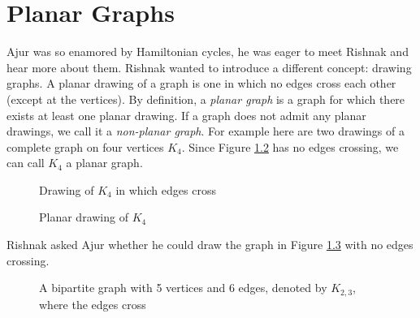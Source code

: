 \chapter{Planar Graphs}
Ajur was so enamored by Hamiltonian cycles, he was eager to meet Rishnak and hear more about them. Rishnak wanted to introduce a different concept: drawing graphs.
A planar drawing of a graph is one in which no edges cross each other (except at
the vertices). By definition, a \emph{planar graph} is a graph for which there exists at least one planar drawing.
If a graph does not admit any planar drawings, we call it a \emph{non-planar graph}.
For example here are two drawings of a complete graph on four vertices $K_4$. Since Figure \ref{9g2} has no edges crossing, we can call $K_4$ a planar graph.
\begin{figure}
\begin{center}
\caption{ Drawing of $K_4$ in which edges cross}\label{9g1}
\end{center}
\end{figure}
\begin{figure}
\begin{center}
\caption{ Planar drawing of $K_4$}\label{9g2}
\end{center}
\end{figure}
 Rishnak asked Ajur whether he could draw the graph in Figure \ref{9g3} with no edges crossing.
 \begin{figure}
\begin{center}
\caption{ A bipartite graph with 5 vertices and 6 edges, denoted by $K_{2,3}$, where the edges cross}\label{9g3}
\end{center}
\end{figure}
